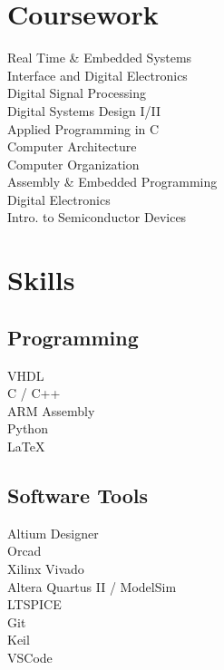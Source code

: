 \documentclass[]{deedy-resume-openfont}
\begin{document}
\begin{minipage}[t]{0.33\textwidth}

\section{Coursework}
Real Time \& Embedded Systems \\
Interface and Digital Electronics \\
Digital Signal Processing \\
Digital Systems Design I/II \\
Applied Programming in C \\
Computer Architecture \\
Computer Organization \\
Assembly \& Embedded Programming \\
Digital Electronics \\
Intro. to Semiconductor Devices \\
\sectionsep


\section{Skills}
\subsection{Programming}


VHDL \\ C / C++ \\ ARM Assembly \\ Python \\  
LaTeX \\


\sectionsep

\subsection{Software Tools}
Altium Designer \\
Orcad \\
Xilinx Vivado \\
Altera Quartus II / ModelSim\\ 
LTSPICE\\
Git\\
Keil\\
VSCode\\
\sectionsep


\end{minipage}
\end{document}
